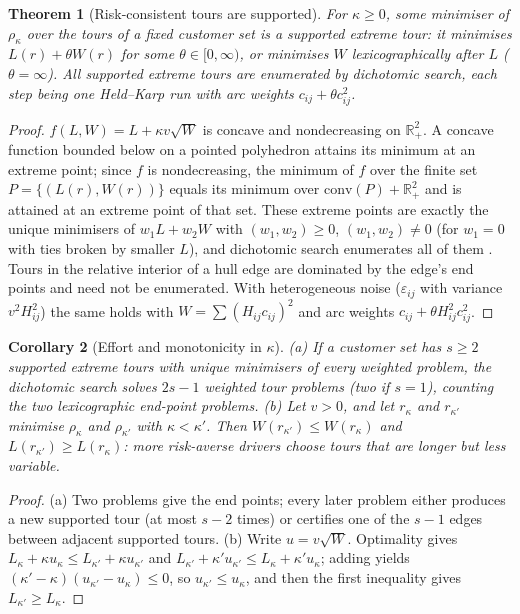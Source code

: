 \documentclass[11pt]{article}
\newtheorem{theorem}{Theorem}
\newtheorem{corollary}[theorem]{Corollary}
\theoremstyle{definition}
\begin{document}
\begin{theorem}[Risk-consistent tours are supported]\label{thm:supported}
For $\kappa\ge0$, some minimiser of $\rho_\kappa$ over the tours of a fixed
customer set is a supported extreme tour: it minimises $L(r)+\theta W(r)$ for
some $\theta\in[0,\infty)$, or minimises $W$ lexicographically after $L$
($\theta=\infty$). All supported extreme tours are enumerated by dichotomic
search, each step being one Held--Karp run with arc weights
$c_{ij}+\theta c_{ij}^2$.
\end{theorem}
\begin{proof}
$f(L,W)=L+\kappa v\sqrt W$ is concave and nondecreasing on $\mathbb{R}^2_+$. A
concave function bounded below on a pointed polyhedron attains its minimum at
an extreme point; since $f$ is nondecreasing, the minimum of $f$ over the
finite set $P=\{(L(r),W(r))\}$ equals its minimum over $\mathrm{conv}(P)+\mathbb{R}^2_+$
and is attained at an extreme point of that set. These extreme points are
exactly the unique minimisers of $w_1L+w_2W$ with $(w_1,w_2)\ge0$,
$(w_1,w_2)\ne0$ (for $w_1=0$ with ties broken by smaller $L$), and dichotomic
search enumerates all of them \citep{aneja1979bicriteria}. Tours in the
relative interior of a hull edge are dominated by the edge's end points and
need not be enumerated. With heterogeneous noise ($\varepsilon_{ij}$ with
variance $v^2H_{ij}^2$) the same holds with $W=\sum (H_{ij}c_{ij})^2$ and arc
weights $c_{ij}+\theta H_{ij}^2c_{ij}^2$.
\end{proof}

\begin{corollary}[Effort and monotonicity in $\kappa$]\label{cor:kappa}
(a) If a customer set has $s\ge2$ supported extreme tours with unique
minimisers of every weighted problem, the dichotomic search solves $2s-1$
weighted tour problems (two if $s=1$), counting the two lexicographic
end-point problems.
(b) Let $v>0$, and let $r_\kappa$ and $r_{\kappa'}$ minimise $\rho_\kappa$ and $\rho_{\kappa'}$ with
$\kappa<\kappa'$. Then $W(r_{\kappa'})\le W(r_\kappa)$ and $L(r_{\kappa'})\ge L(r_\kappa)$:
more risk-averse drivers choose tours that are longer but less variable.
\end{corollary}
\begin{proof}
(a) Two problems give the end points; every later problem either produces a
new supported tour (at most $s-2$ times) or certifies one of the $s-1$ edges
between adjacent supported tours. (b) Write $u=v\sqrt W$. Optimality gives
$L_\kappa+\kappa u_\kappa\le L_{\kappa'}+\kappa u_{\kappa'}$ and
$L_{\kappa'}+\kappa'u_{\kappa'}\le L_\kappa+\kappa'u_\kappa$; adding yields
$(\kappa'-\kappa)(u_{\kappa'}-u_\kappa)\le0$, so $u_{\kappa'}\le u_\kappa$, and
then the first inequality gives $L_{\kappa'}\ge L_\kappa$.
\end{proof}
\end{document}
